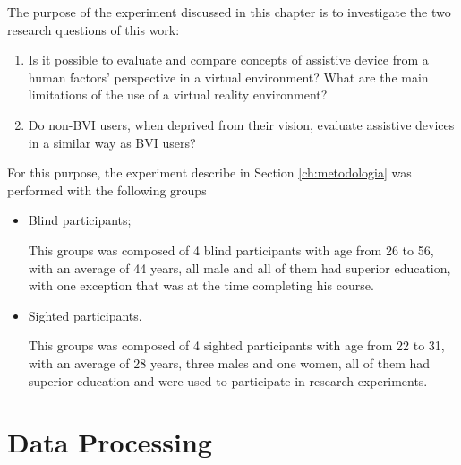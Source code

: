 

The purpose of the experiment discussed in this chapter is to investigate the two research questions of this work:

\begin{enumerate}[leftmargin = 3.5em, label = $H_\arabic*$:]
    \item Is it possible to evaluate and compare concepts of assistive device from a human factors’ perspective in a virtual environment? What are the main limitations of the use of a virtual reality environment?
    \item Do non-BVI users, when deprived from their vision, evaluate assistive devices in a similar way as BVI users?
\end{enumerate}

For this purpose, the experiment describe in Section \ref{ch:metodologia} was performed with the following groups

\begin{itemize}
    \item Blind participants;

        This groups was composed of 4 blind participants with age from 26 to 56, with an average of 44 years, all male and all of them had superior education, with one exception that was at the time completing his course.

    \item Sighted participants.
    
        This groups was composed of 4 sighted participants with age from 22 to 31, with an average of 28 years, three males and one women, all of them had superior education and were used to participate in research experiments.
\end{itemize}

\section*{Data Processing}

